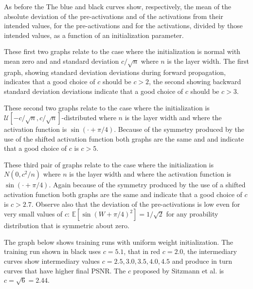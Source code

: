 \documentclass{letter}
\begin{document}
As before the The blue and black curves show, respectively, the mean of the absolute deviation of the pre-activations and of the activations from their intended values, for the pre-activations and for the activations, divided by those intended values, as a function of an initialization parameter.

These first two graphs relate to the case where the initialization is normal with mean zero and and standard deviation $c/\sqrt{n}$ where $n$ is the layer width. The first graph, showing standard deviation deviations during forward propagation, indicates that a good choice of $c$ should be $c>2$, the second showing backward standard deviation deviations indicate that a good choice of $c$ should be $c>3$.

\begin{center}


\end{center}

These second two graphs relate to the case where the initialization is $ \mathcal{U}[-c/\sqrt{n},c/\sqrt{n}]$-distributed where $n$ is the layer width and where the activation function is $\sin(\cdot + \pi/4)$. Because of the symmetry produced by the use of the shifted activation function both graphs are the same and and indicate that a good choice of $c$ is $c>5$.

\begin{center}


\end{center}

These third pair of graphs relate to the case where the initialization is $N(0,c^2/n)$ where $n$ is the layer width and where the activation function is $\sin(\cdot + \pi/4)$. Again because of the symmetry produced by the use of a shifted activation function both graphs are the same and indicate that a good choice of $c$ is $c>2.7$. Observe also that the deviation of the pre-activations is low even for very small values of $c$: $\mathbb{E}[\sin(W+\pi/4)^2]=1/\sqrt{2}$ for any proability distribution that is symmetric about zero.

\begin{center}


\end{center}

The graph below shows training runs with uniform weight initialization. The training run shown in black uses $c=5.1$, that in red $c=2.0$, the intermediary curves show intermediary values $c=2.5, 3.0, 3.5, 4.0, 4.5$ and produce in turn curves that have higher final PSNR. The $c$ proposed by Sitzmann et al. is $c=\sqrt{6}=2.44$.
\end{document}
